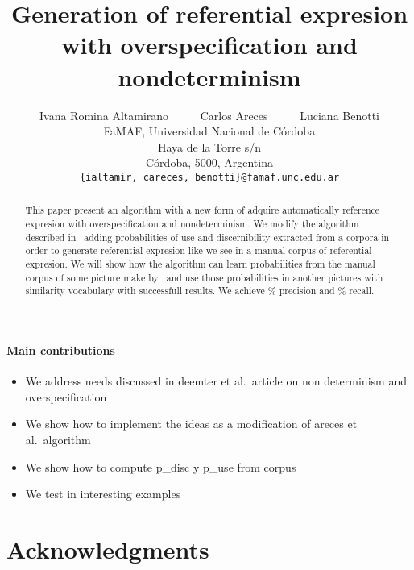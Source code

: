 \documentclass[11pt,letterpaper]{article}
\title{Generation of referential expresion with overspecification and nondeterminism}
\author{Ivana Romina Altamirano 
	  \ \ \ \ \ 
	Carlos Areces
	  \ \ \ \ \ 
	Luciana Benotti\\
	    FaMAF, Universidad Nacional de C\'ordoba\\
	    Haya de la Torre s/n\\
	    C\'ordoba, 5000, Argentina\\
	    	    {\tt \{ialtamir, careces, benotti\}@famaf.unc.edu.ar}	    }
\date{}
\newcommand{\pdisc}{\small \textsf{p\_disc}\xspace}
\newcommand{\puse}{\small \textsf{p\_use}\xspace}
\begin{document}
\maketitle
\begin{abstract}
  This paper present an algorithm with a new form of adquire automatically reference expresion with overspecification and nondeterminism. We modify the algorithm described in~\cite{arec2:2008:Areces} adding probabilities of use and discernibility extracted from a corpora in order to generate referential expresion like we see in a manual corpus of referential expresion. We will show how the algorithm can learn probabilities from the manual corpus of some picture make by~\cite{viethen-dale:2011:UCNLG+Eval} and use those probabilities in another pictures with similarity vocabulary with successfull results. We achieve \% precision and \% recall. 
\end{abstract}

\paragraph{Main contributions}
\begin{itemize}
\item We address needs discussed in deemter et al.\ article on non determinism and overspecification
\item We show how to implement the ideas as a modification of areces et al.\ algorithm
\item We show how to compute \pdisc y \puse from corpus
\item We test in interesting examples
\end{itemize}









\section*{Acknowledgments}



\end{document}
